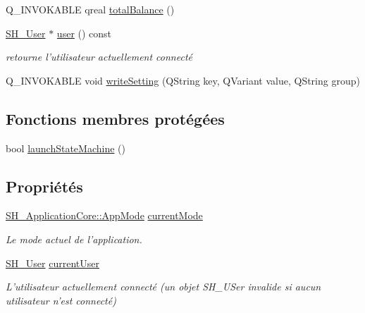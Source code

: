 \begin{DoxyCompactItemize}
\item 
Q\-\_\-\-I\-N\-V\-O\-K\-A\-B\-L\-E qreal \hyperlink{classSH__ApplicationCore_a7c97dd4990e8f4b24afda9e7c5b88c21}{total\-Balance} ()
\item 
\hyperlink{classSH__User}{S\-H\-\_\-\-User} $\ast$ \hyperlink{classSH__ApplicationCore_a57fa0d6b5fd5f4a02f8a129ee470697b}{user} () const 
\begin{DoxyCompactList}\small\item\em retourne l'utilisateur actuellement connecté \end{DoxyCompactList}\item 
Q\-\_\-\-I\-N\-V\-O\-K\-A\-B\-L\-E void \hyperlink{classSH__ApplicationCore_af58caab2fbbdc5a5c0dd0d162aa643ef}{write\-Setting} (Q\-String key, Q\-Variant value, Q\-String group)
\end{DoxyCompactItemize}
\subsection*{Fonctions membres protégées}
\begin{DoxyCompactItemize}
\item 
bool \hyperlink{classSH__ApplicationCore_ac0d2178f5351e1eb12ff5d6c6afb83d6}{launch\-State\-Machine} ()
\end{DoxyCompactItemize}
\subsection*{Propriétés}
\begin{DoxyCompactItemize}
\item 
\hyperlink{classSH__ApplicationCore_a6b93b2f83a290305f282616eb2935899}{S\-H\-\_\-\-Application\-Core\-::\-App\-Mode} \hyperlink{classSH__ApplicationCore_ac83ee9ad9c649105eb8eac5fac74b951}{current\-Mode}
\begin{DoxyCompactList}\small\item\em Le mode actuel de l'application. \end{DoxyCompactList}\item 
\hyperlink{classSH__User}{S\-H\-\_\-\-User} \hyperlink{classSH__ApplicationCore_aaa2609e7bcda83fd65b602e7e211b027}{current\-User}
\begin{DoxyCompactList}\small\item\em L'utilisateur actuellement connecté (un objet S\-H\-\_\-\-U\-Ser invalide si aucun utilisateur n'est connecté) \end{DoxyCompactList}\end{DoxyCompactItemize}
